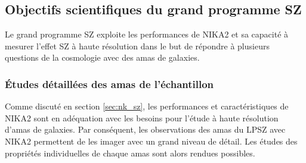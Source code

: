\subsection{Objectifs scientifiques du grand programme SZ} \label{sec:lpsz_sci}

Le grand programme SZ exploite les performances de NIKA2 et sa capacité à mesurer l'effet SZ à haute résolution dans le but de répondre à plusieurs questions de la cosmologie avec des amas de galaxies.

\subsubsection{Études détaillées des amas de l'échantillon} %
Comme discuté en section \ref{sec:nk_sz}, les performances et caractéristiques de NIKA2 sont en adéquation avec les besoins pour l'étude à haute résolution d'amas de galaxies.
Par conséquent, les observations des amas du LPSZ avec NIKA2 permettent de les imager avec un grand niveau de détail.
Les études des propriétés individuelles de chaque amas sont alors rendues possibles.

